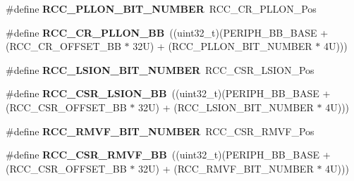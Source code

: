 \begin{DoxyCompactItemize}
\item 
\mbox{\label{group___r_c_c___bit_address___alias_region_gaed4c77e51cc821b9645cb7874bf5861b}} 
\#define {\bfseries R\+C\+C\+\_\+\+P\+L\+L\+O\+N\+\_\+\+B\+I\+T\+\_\+\+N\+U\+M\+B\+ER}~R\+C\+C\+\_\+\+C\+R\+\_\+\+P\+L\+L\+O\+N\+\_\+\+Pos
\item 
\mbox{\label{group___r_c_c___bit_address___alias_region_ga0b0a8f171b66cc0d767716ba23ad3c6f}} 
\#define {\bfseries R\+C\+C\+\_\+\+C\+R\+\_\+\+P\+L\+L\+O\+N\+\_\+\+BB}~((uint32\+\_\+t)(P\+E\+R\+I\+P\+H\+\_\+\+B\+B\+\_\+\+B\+A\+SE + (R\+C\+C\+\_\+\+C\+R\+\_\+\+O\+F\+F\+S\+E\+T\+\_\+\+BB $\ast$ 32\+U) + (\+R\+C\+C\+\_\+\+P\+L\+L\+O\+N\+\_\+\+B\+I\+T\+\_\+\+N\+U\+M\+B\+E\+R $\ast$ 4\+U)))
\item 
\mbox{\label{group___r_c_c___bit_address___alias_region_ga577ffeb20561aa8395fe5327807b5709}} 
\#define {\bfseries R\+C\+C\+\_\+\+L\+S\+I\+O\+N\+\_\+\+B\+I\+T\+\_\+\+N\+U\+M\+B\+ER}~R\+C\+C\+\_\+\+C\+S\+R\+\_\+\+L\+S\+I\+O\+N\+\_\+\+Pos
\item 
\mbox{\label{group___r_c_c___bit_address___alias_region_gac34a2d63deae3efc65e66f8fb3c26dae}} 
\#define {\bfseries R\+C\+C\+\_\+\+C\+S\+R\+\_\+\+L\+S\+I\+O\+N\+\_\+\+BB}~((uint32\+\_\+t)(P\+E\+R\+I\+P\+H\+\_\+\+B\+B\+\_\+\+B\+A\+SE + (R\+C\+C\+\_\+\+C\+S\+R\+\_\+\+O\+F\+F\+S\+E\+T\+\_\+\+BB $\ast$ 32\+U) + (\+R\+C\+C\+\_\+\+L\+S\+I\+O\+N\+\_\+\+B\+I\+T\+\_\+\+N\+U\+M\+B\+E\+R $\ast$ 4\+U)))
\item 
\mbox{\label{group___r_c_c___bit_address___alias_region_ga6cd8836230fcbaf491e9713233690611}} 
\#define {\bfseries R\+C\+C\+\_\+\+R\+M\+V\+F\+\_\+\+B\+I\+T\+\_\+\+N\+U\+M\+B\+ER}~R\+C\+C\+\_\+\+C\+S\+R\+\_\+\+R\+M\+V\+F\+\_\+\+Pos
\item 
\mbox{\label{group___r_c_c___bit_address___alias_region_ga40f8ee2c5fa801d0b72ae230578dd77b}} 
\#define {\bfseries R\+C\+C\+\_\+\+C\+S\+R\+\_\+\+R\+M\+V\+F\+\_\+\+BB}~((uint32\+\_\+t)(P\+E\+R\+I\+P\+H\+\_\+\+B\+B\+\_\+\+B\+A\+SE + (R\+C\+C\+\_\+\+C\+S\+R\+\_\+\+O\+F\+F\+S\+E\+T\+\_\+\+BB $\ast$ 32\+U) + (\+R\+C\+C\+\_\+\+R\+M\+V\+F\+\_\+\+B\+I\+T\+\_\+\+N\+U\+M\+B\+E\+R $\ast$ 4\+U)))

\end{DoxyCompactItemize}
